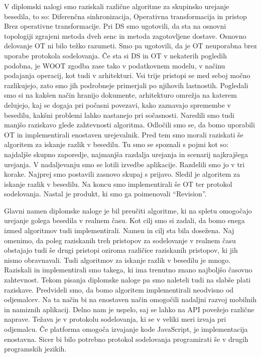 \documentclass[a4paper, 12pt, twoside]{book}
\begin{document}
V diplomski nalogi smo raziskali različne algoritme za skupinsko urejanje besedila, to so: Diferenčna sinhronizacija, Operativna transformacija in pristop Brez operativne transformacije. Pri DS smo ugotovili, da sta na osnovni topologiji zgrajeni metoda dveh senc in metoda zagotovljene dostave. Osnovno delovanje OT ni bilo težko razumeti. Smo pa ugotovili, da je OT neuporabna brez uporabe protokola sodelovanja. Če sta si DS in OT v nekaterih pogledih podobna, je WOOT zgodba zase tako v podatkovnem modelu, v načinu podajanja operacij, kot tudi v arhitekturi. Vsi trije pristopi se med seboj močno razlikujejo, zato smo jih podrobneje primerjali po njihovih lastnostih. Pogledali smo si na kakšen način hranijo dokumente, arhitekturo omrežja na katerem delujejo, kaj se dogaja pri počasni povezavi, kako zaznavajo spremembe v besedilu, kakšni problemi lahko nastanejo pri sočasnosti. Naredili smo tudi manjšo raziskavo glede zahtevnosti algoritma. Odločili smo se, da bomo uporabili OT in implementirali enostaven urejevalnik. Pred tem smo morali raziskati še algoritem za iskanje razlik v besedilu. Tu smo se spoznali s pojmi kot so: najdaljše skupno zaporedje, najmanjša razdalja urejanja in scenarij najkrajšega urejanja. V nadaljevanju smo se lotili izvedbe aplikacije. Razdelili smo jo v tri korake. Najprej smo postavili zasnovo skupaj s prijavo. Sledil je algoritem za iskanje razlik v besedilu. Na koncu smo implementirali še OT ter protokol sodelovanja. Nastal je produkt, ki smo ga poimenovali “Revision”.

Glavni namen diplomske naloge je bil preučiti algoritme, ki na spletu omogočajo urejanje golega besedila v realnem času. Kot cilj smo si zadali, da bomo enega izmed algoritmov tudi implementirali. Namen in cilj sta bila dosežena. Naj omenimo, da poleg raziskanih treh pristopov za sodelovanje v realnem času obstajajo tudi še drugi pristopi oziroma različice raziskanih pristopov, ki jih nismo obravnavali. Tudi algoritmov za iskanje razlik v besedilu je mnogo. Raziskali in implementirali smo takega, ki ima trenutno znano najboljšo časovno zahtevnost. Tekom pisanja diplomske naloge pa smo naleteli tudi na slabše plati raziskave. Predvideli smo, da bomo algoritem implementirali neodvisno od odjemalcev. Na ta način bi na enostaven način omogočili nadaljni razvoj mobilnih in namiznih aplikacij. Delno nam je uspelo, saj se lahko na API povežejo različne naprave. Težava je v protokolu sodelovanja, ki se v veliki meri izvaja pri odjemalcu. Če platforma omogoča izvajanje kode JavaScript, je implementacija enostavna. Sicer bi bilo potrebno protokol sodelovanja programirati še v drugih programskih jezikih.
\end{document}
